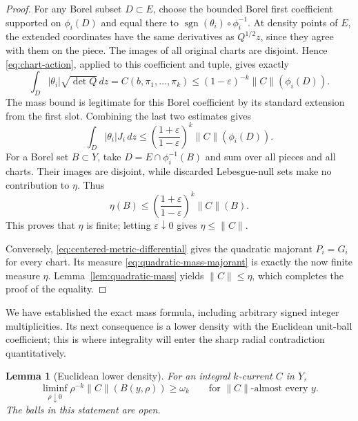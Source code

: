 \documentclass[11pt]{article}
\numberwithin{equation}{section}
\newtheorem{lemma}[theorem]{Lemma}
\theoremstyle{definition}
\theoremstyle{remark}
\newcommand{\dd}{\,d}
\newcommand{\sgn}{\operatorname{sgn}}
\begin{document}
\begin{proof}
For any Borel subset \(D\subset E\), choose the bounded Borel first
coefficient supported on \(\phi_i(D)\) and equal there to
\(\sgn(\theta_i)\circ\phi_i^{-1}\). At density points of \(E\), the
extended coordinates have the same derivatives as \(Q^{1/2}z\), since
they agree with them on the piece. The images of all original charts
are disjoint. Hence \eqref{eq:chart-action}, applied to this coefficient
and tuple, gives exactly
\[
 \int_D|\theta_i|\sqrt{\det Q}\dd z
 = C(b,\pi_1,\ldots,\pi_k)
 \le(1-\varepsilon)^{-k}\|C\|(\phi_i(D)).
\]
The mass bound is legitimate for this Borel coefficient by its standard
extension from the first slot. Combining the last two estimates gives
\[
 \int_D|\theta_i|J_i\dd z
 \le\left(\frac{1+\varepsilon}{1-\varepsilon}\right)^k
       \|C\|(\phi_i(D)).
\]
For a Borel set \(B\subset Y\), take
\(D=E\cap\phi_i^{-1}(B)\) and sum over all pieces and all charts.
Their images are disjoint, while discarded Lebesgue-null sets make no
contribution to \(\eta\). Thus
\[
 \eta(B)\le
 \left(\frac{1+\varepsilon}{1-\varepsilon}\right)^k\|C\|(B).
\]
This proves that \(\eta\) is finite; letting
\(\varepsilon\downarrow0\) gives \(\eta\le\|C\|\).

Conversely, \eqref{eq:centered-metric-differential} gives the quadratic
majorant \(P_i=G_i\) for every chart. Its measure
\eqref{eq:quadratic-mass-majorant} is exactly the now finite measure
\(\eta\). Lemma~\ref{lem:quadratic-mass} yields \(\|C\|\le\eta\),
which completes the proof of the equality.
\end{proof}

We have established the exact mass formula, including arbitrary signed
integer multiplicities. Its next consequence is a lower density with
the Euclidean unit-ball coefficient; this is where integrality will
enter the sharp radial contradiction quantitatively.

\begin{lemma}[Euclidean lower density]
\label{lem:euclidean-density}
For an integral \(k\)-current \(C\) in \(Y\),
\begin{equation}
\label{eq:euclidean-lower-density}
 \liminf_{\rho\downarrow0}
       \rho^{-k}\|C\|(B(y,\rho))\ge\omega_k
 \qquad\text{for }\|C\|\text{-almost every }y.
\end{equation}
The balls in this statement are open.
\end{lemma}
\end{document}
